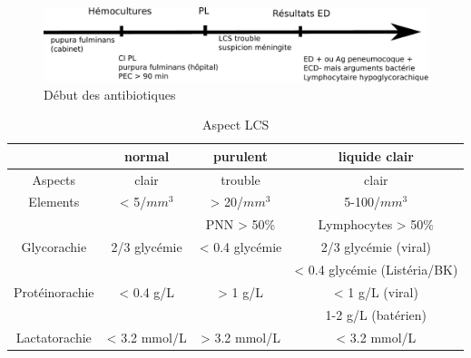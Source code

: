 \begin{figure}[htpb]
  \centering
  \begin{minipage}{0.42\textwidth}
  \end{minipage}
  \begin{minipage}{0.69\textwidth}
  \end{minipage}
\end{figure}

\begin{figure}[htpb]
  \centering
  \includegraphics[width=0.8\linewidth]{../../pictures/medecine/148_antibio}
  \caption{Début des antibiotiques}
\end{figure}

\begin{table}[htpb]
  \centering
  \caption{Aspect LCS}
  
  \begin{tabular}{*{4}{c}}
    \toprule
    &normal & purulent & liquide clair \\
    \midrule
    Aspects & clair & trouble & clair \\
    Elements & < 5/\(mm^3\) & > 20/\(mm^3\)  & 5-100/\(mm^3\)
    \\
    & & PNN > 50\% & Lymphocytes > 50\% \\
    Glycorachie & 2/3 glycémie & < 0.4 glycémie & 2/3 glycémie (viral)\\
    & & & < 0.4 glycémie (Listéria/BK) \\
    \midrule
    Protéinorachie & < 0.4 g/L & > 1 g/L & < 1 g/L (viral)\\
    & & & 1-2 g/L (batérien) \\
    Lactatorachie & < 3.2 mmol/L & > 3.2 mmol/L & <
    3.2 mmol/L \\
    \bottomrule
  \end{tabular}
\end{table}


